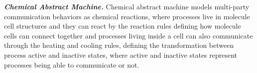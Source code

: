 \noindent\textbf{\textit{Chemical Abstract Machine.}} Chemical abstract machine \cite{BERRY1992217} models multi-party communication behaviors as chemical reactions, where processes live in molecule cell structures and they can react by the reaction rules defining how molecule cells can connect together and processes living inside a cell can also communicate through the heating and cooling rules, 
defining the transformation between process active and inactive states, where active and inactive states represent processes being able to communicate or not.

